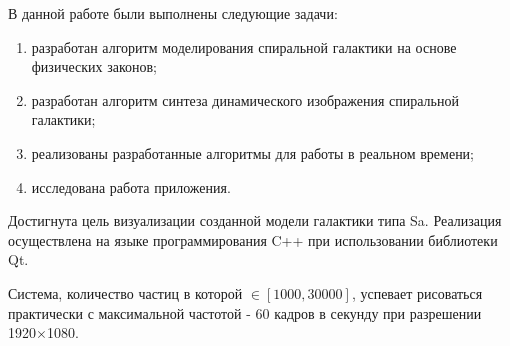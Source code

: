 \Conclusion

В данной работе были выполнены следующие задачи:
\begin{enumerate}
    \item разработан алгоритм моделирования спиральной галактики на основе физических законов;
    \item разработан алгоритм синтеза динамического изображения спиральной галактики;
    \item реализованы разработанные алгоритмы для работы в реальном времени;
    \item исследована работа приложения.
\end{enumerate}

Достигнута цель визуализации созданной модели галактики типа Sa. Реализация осуществлена на языке программирования C++ при использовании библиотеки Qt.

Система, количество частиц в которой $\in [1000, 30000]$, успевает рисоваться практически с максимальной частотой - 60 кадров в секунду при разрешении 1920$\times{}$1080.

